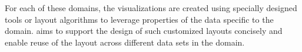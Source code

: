 For each of these domains, the visualizations are created using specially
designed tools or layout algorithms to leverage properties of the data
specific to the domain. \projectname aims to support the design of such
customized layouts concisely and enable reuse of the layout across different
data sets in the domain.




